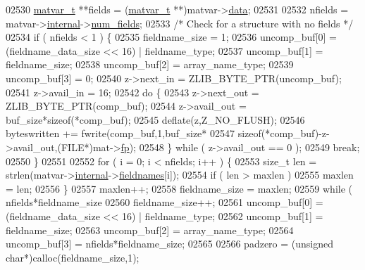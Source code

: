 \begin{DoxyCode}
{{{{{{{{{{{{{{{{02530             \hyperlink{group___m_a_t_structmatvar__t}{matvar\_t} **fields = (\hyperlink{group___m_a_t_structmatvar__t}{matvar\_t} **)matvar->\hyperlink{group___m_a_t_a5672978efa230bbdecdf38ede781f7fa}{data};
02531 
02532             nfields = matvar->\hyperlink{group___m_a_t_a6e97e3ed9f40c49322c18561c2a94e92}{internal}->\hyperlink{structmatvar__internal_a93fc447484f455eddf9334f2e9e411c2}{num\_fields};
02533             \textcolor{comment}{/* Check for a structure with no fields */}
02534             if ( nfields < 1 ) \{
02535                 fieldname\_size = 1;
02536                 uncomp\_buf[0] = (fieldname\_data\_size << 16) | fieldname\_type;
02537                 uncomp\_buf[1] = fieldname\_size;
02538                 uncomp\_buf[2] = array\_name\_type;
02539                 uncomp\_buf[3] = 0;
02540                 z->next\_in  = ZLIB\_BYTE\_PTR(uncomp\_buf);
02541                 z->avail\_in = 16;
02542                 \textcolor{keywordflow}{do} \{
02543                     z->next\_out  = ZLIB\_BYTE\_PTR(comp\_buf);
02544                     z->avail\_out = buf\_size*\textcolor{keyword}{sizeof}(*comp\_buf);
02545                     deflate(z,Z\_NO\_FLUSH);
02546                     byteswritten += fwrite(comp\_buf,1,buf\_size*
02547                         \textcolor{keyword}{sizeof}(*comp\_buf)-z->avail\_out,(FILE*)mat->\hyperlink{struct__mat__t_a85f562e407ca9ad4d2a6e14f839432b7}{fp});
02548                 \} \textcolor{keywordflow}{while} ( z->avail\_out == 0 );
02549                 \textcolor{keywordflow}{break};
02550             \}
02551 
02552             \textcolor{keywordflow}{for} ( i = 0; i < nfields; i++ ) \{
02553                 \textcolor{keywordtype}{size\_t} len = strlen(matvar->\hyperlink{group___m_a_t_a6e97e3ed9f40c49322c18561c2a94e92}{internal}->\hyperlink{structmatvar__internal_a7574d000bfc98ad4860ae6590b8d4985}{fieldnames}[i]);
02554                 \textcolor{keywordflow}{if} ( len > maxlen )
02555                     maxlen = len;
02556             \}
02557             maxlen++;
02558             fieldname\_size = maxlen;
02559             \textcolor{keywordflow}{while} ( nfields*fieldname\_size %
02560                 fieldname\_size++;
02561             uncomp\_buf[0] = (fieldname\_data\_size << 16) | fieldname\_type;
02562             uncomp\_buf[1] = fieldname\_size;
02563             uncomp\_buf[2] = array\_name\_type;
02564             uncomp\_buf[3] = nfields*fieldname\_size;
02565 
02566             padzero = (\textcolor{keywordtype}{unsigned} \textcolor{keywordtype}{char}*)calloc(fieldname\_size,1);
}}}}}}}}}}}}}}}}
\end{DoxyCode}
